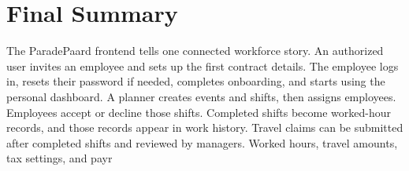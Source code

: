 \documentclass[11pt]{article}
\begin{document}
\section{Final Summary}

The ParadePaard frontend tells one connected workforce story. An authorized user invites an employee and sets up the first contract details. The employee logs in, resets their password if needed, completes onboarding, and starts using the personal dashboard. A planner creates events and shifts, then assigns employees. Employees accept or decline those shifts. Completed shifts become worked-hour records, and those records appear in work history. Travel claims can be submitted after completed shifts and reviewed by managers. Worked hours, travel amounts, tax settings, and payr
\end{document}
